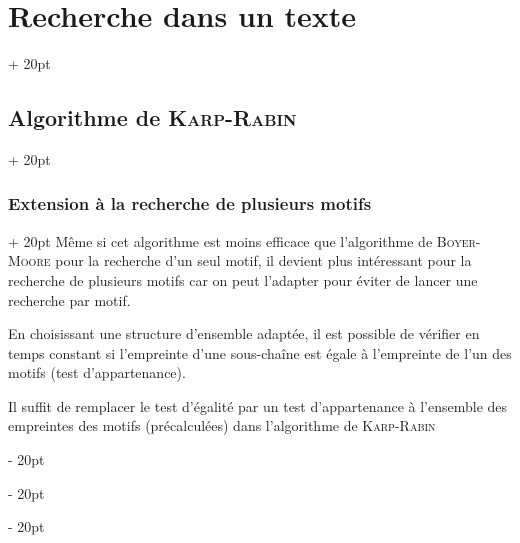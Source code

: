 \documentclass[a4paper, 12pt, twoside]{article}
\newcommand{\ind}[1][20pt]{\advance\leftskip + #1}
\newcommand{\deind}[1][20pt]{\advance\leftskip - #1}
\newenvironment{indt}[2][20pt]{#2 \par \ind[#1]}{\par \deind} %
\begin{document}
\begin{indt}{\section{Recherche dans un texte}}
\begin{indt}{\subsection{Algorithme de \textsc{Karp-Rabin}}}
            \begin{indt}{\subsubsection{Extension à la recherche de plusieurs motifs}}
                Même si cet algorithme est moins efficace que l'algorithme de \textsc{Boyer-Moore} pour la recherche d'un seul motif, il devient plus intéressant pour la recherche de plusieurs motifs car on peut l'adapter pour éviter de lancer une recherche par motif.

                En choisissant une structure d'ensemble adaptée, il est possible de vérifier en temps constant si l'empreinte d'une sous-chaîne est égale à l'empreinte de l'un des motifs (test d'appartenance).

                Il suffit de remplacer le test d'égalité par un test d'appartenance à l'ensemble des empreintes des motifs (précalculées) dans l'algorithme de \textsc{Karp-Rabin}
            \end{indt}
        \end{indt}
        
    \end{indt}

    \vspace{12pt}
    
\end{document}

